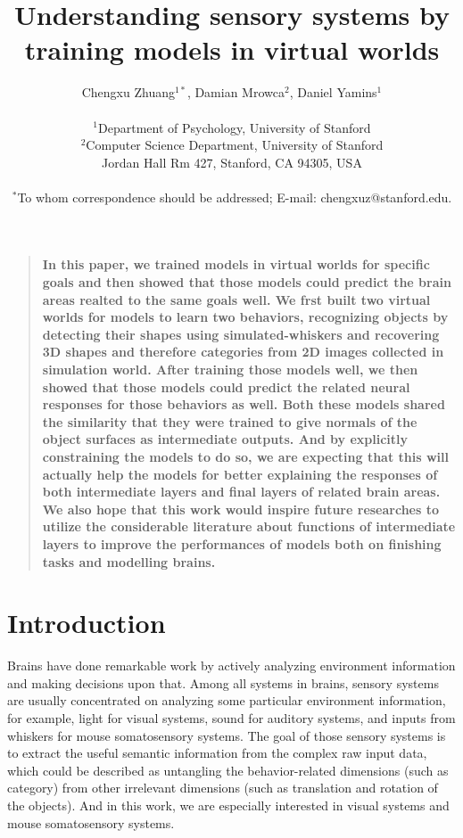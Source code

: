 \documentclass[12pt]{article}
\title{Understanding sensory systems by training models in virtual worlds}
\author
{Chengxu Zhuang$^{1\ast}$, Damian Mrowca$^{2}$, Daniel Yamins$^{1}$\\
\\
\normalsize{$^{1}$Department of Psychology, University of Stanford}\\
\normalsize{$^{2}$Computer Science Department, University of Stanford}\\
\normalsize{Jordan Hall Rm 427, Stanford, CA 94305, USA}\\
\\
\normalsize{$^\ast$To whom correspondence should be addressed; E-mail: chengxuz@stanford.edu.}
}
\date{}
\newenvironment{sciabstract}{%
\begin{quote} \bf}
{\end{quote}}
\begin{document}

\baselineskip24pt


\maketitle


\begin{sciabstract}
    In this paper, we trained models in virtual worlds for specific goals and then showed that those models could predict the brain areas realted to the same goals well.
    We frst built two virtual worlds for models to learn two behaviors, recognizing objects by detecting their shapes using simulated-whiskers and recovering 3D shapes and therefore categories from 2D images collected in simulation world. After training those models well, we then showed that those models could predict the related neural responses for those behaviors as well.
    Both these models shared the similarity that they were trained to give normals of the object surfaces as intermediate outputs. And by explicitly constraining the models to do so, we are expecting that this will actually help the models for better explaining the responses of both intermediate layers and final layers of related brain areas.
    We also hope that this work would inspire future researches to utilize the considerable literature about functions of intermediate layers to improve the performances of models both on finishing tasks and modelling brains.

\end{sciabstract}

\section*{Introduction}

Brains have done remarkable work by actively analyzing environment information and making decisions upon that. Among all systems in brains, sensory systems are usually concentrated on analyzing some particular environment information, for example, light for visual systems, sound for auditory systems, and inputs from whiskers for mouse somatosensory systems.
The goal of those sensory systems is to extract the useful semantic information from the complex raw input data, which could be described as untangling the behavior-related dimensions (such as category) from other irrelevant dimensions (such as translation and rotation of the objects)\cite{yamins2016using}. And in this work, we are especially interested in visual systems and mouse somatosensory systems.
\end{document}
